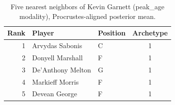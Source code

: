 \begin{table}[htbp]
  \centering\small
  \begin{tabular}{rllc}
    \toprule
    Rank & Player & Position & Archetype \\
    \midrule
    1 & Arvydas Sabonis & C & 1 \\
    2 & Donyell Marshall & F & 1 \\
    3 & De'Anthony Melton & G & 1 \\
    4 & Markieff Morris & F & 1 \\
    5 & Devean George & F & 1 \\
    \bottomrule
  \end{tabular}
  \caption{Five nearest neighbors of Kevin Garnett (peak_age modality), Procrustes-aligned posterior mean.}
  \label{tab:Kevin_Garnett_neighbors_peak_age}
\end{table}

